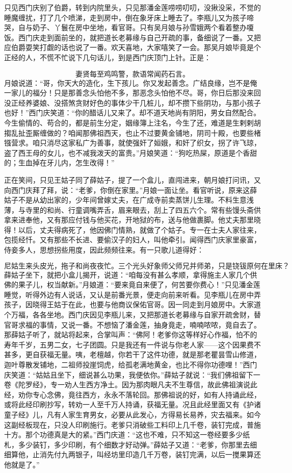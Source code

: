 只见西门庆别了伯爵，转到内院里头，只见那潘金莲唠唠叨叨，没揪没采，不觉的睡魔缠扰，打了几个喷涕，走到房中，倒在象牙床上睡去了。李瓶儿又为孩子啼哭，自与奶子、丫鬟在房中坐地，看官哥。只有吴月娘与孙雪娥两个看着整办嗄饭。西门庆走到面前坐的，就把道长老募缘与自己开疏的事，备细说了一番。又把应伯爵耍笑打觑的话也说了一番。欢天喜地，大家嘻笑了一会。那吴月娘毕竟是个正经的人，不慌不忙说下几句话儿，到是西门庆顶门上针。正是：

\[
妻贤每至鸡鸣警，款语常闻药石言。
\]
月娘说道：“哥，你天大的造化，生下孩儿。你又发起善念。广结良缘，岂不是俺一家儿的福分！只是那善念头怕他不多，那恶念头怕他不尽。哥，你日后那没来回没正经养婆娘、没搭煞贪财好色的事体少干几桩儿，却不攒下些阴功，与那小孩子也好！”西门庆笑道：“你的醋话儿又来了。却不道天地尚有阴阳，男女自然配合。今生偷情的、苟合的，都是前生分定，姻缘簿上注名，今生了还，难道是生剌剌胡搊乱扯歪厮缠做的？咱闻那佛祖西天，也止不过要黄金铺地，阴司十殿，也要些楮镪营求。咱只消尽这家私广为善事，就使强奸了姮娥，和奸了织女，拐了许飞琼，盗了西王母的女儿，也不减我泼天的富贵。”月娘笑道：“狗吃热屎，原道是个香甜的；生血掉在牙儿内，怎生改得！”

正在笑间，只见王姑子同了薛姑子，提了一个盒儿，直闯进来，朝月娘打问讯，又向西门庆拜了拜，说：“老爹，你倒在家里。”月娘一面让坐。看官听说，原来这薛姑子不是从幼出家的，少年间曾嫁丈夫，在广成寺前卖蒸饼儿生理。不料生意浅薄，与寺里的和尚、行童调嘴弄舌，眉来眼去，刮上了四五六个。常有些馒头斋供拿来进奉他，又有那应付钱与他买花，开地狱的布，送与他做裹脚。他丈夫那里晓得！以后，丈夫得病死了，他因佛门情熟，就做了个姑子。专一在士夫人家往来，包揽经忏。又有那些不长进、要偷汉子的妇人，叫他牵引。闻得西门庆家里豪富，侍妾多人，思想拐些用度，因此频频往来。有一只歌儿道得好：

\[
尼姑生来头皮光，拖子和尚夜夜忙。三个光头好象师父师兄并师弟，只是铙钹原何在里床？
\]
薛姑子坐下，就把小盒儿揭开，说道：“咱每没有甚么孝顺，拿得施主人家几个供佛的果子儿，权当献新。”月娘道：“要来竟自来便了，何苦要你费心！”只见潘金莲睡觉，听得外边有人说话，又认是前番光景，便走向前来听看。见李瓶儿在房中弄孩子，因晓得王姑于在此，也要与他商议保佑官哥。因一同走到月娘房中。大家道个万福，各各坐地。西门庆因见李瓶儿来，又把那道长老募缘与自家开疏舍财，替官哥求福的事情，又说一番。不想恼了潘金莲，抽身竟走，喃喃哝哝，竟自去了。那薛姑子听了，就站将起来，合掌叫声：“佛阿！老爹你这等样好心作福，怕不的寿年千岁，五男二女，七子团圆。只是我还有一件说与你老人家——这个因果费不甚多，更自获福无量。咦，老檀越，你若干了这件功德，就是那老瞿昙雪山修道，迦叶尊散发铺地，二祖师投崖饲虎，给孤老满地黄金，也比不得你功德哩！”西门庆笑道：“姑姑且坐下，细说甚么功果，我便依你。”薛姑子就说：“我们佛祖留下一卷《陀罗经》，专一劝人生西方净土。因为那肉眼凡夫不生尊信，故此佛祖演说此经，劝你专心念佛，竟往西方，永永不落轮回。那佛祖说的好，如有人持诵此经，或将此经印刷抄写，转劝一人至千万人持诵，获福无量。况且此经里面又有《护诸童子经》儿，凡有人家生育男女，必要从此发心，方得易长易养，灾去福来。如今这副经板现在，只没人印刷施行。老爹只消破些工料印上几千卷，装钉完成，普施十方。那个功德真是大的紧。”西门庆道：“这也不难，只不知这一卷经要多少纸札，多少装钉，多少印刷，有个细数才好动弹。”薛姑子又道：“老爹，你那里去细细算他，止消先付九两银子，叫经坊里印造几千万卷，装钉完满，以后一搅果算还他就是了。”

